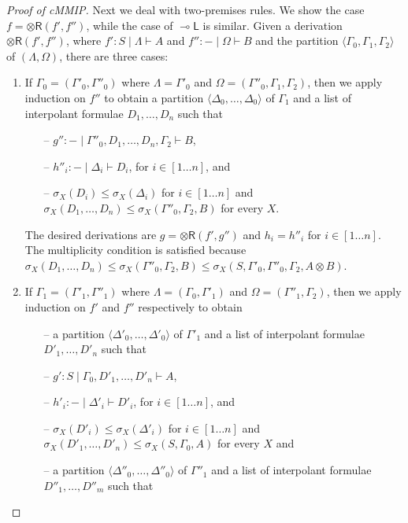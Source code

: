 \documentclass[sn-mathphys-num]{sn-jnl}%
\newcommand{\GG}{\Gamma}
\newcommand{\GD}{\Delta}
\newcommand{\GL}{\Lambda}
\newcommand{\GO}{\Omega}
\newcommand{\vd}{\vdash}
\newcommand{\tr}{\otimes\mathsf{R}}
\newcommand{\ot}{\otimes}
\newcommand{\lolli}{\multimap}
\newcommand{\lleft}{{\lolli}\mathsf{L}}
\newcommand{\gs}[1]{\sigma_{X} (#1)}
\newcommand{\cMMIP}{\textsf{cMMIP}}
\theoremstyle{thmstyleone}%
\theoremstyle{thmstyletwo}%
\theoremstyle{thmstylethree}%
\begin{document}
\begin{proof}[Proof of \cMMIP]
Next we deal with two-premises rules.
We show the case $f = \tr (f' , f'')$, while the case of $\lleft$ is similar.
Given a derivation $\tr (f' , f'')$, where $f' : S \mid \GL \vd A$ and $f'' : {-} \mid \GO \vd B$ and the partition $\langle \GG_0 , \GG_1, \GG_2 \rangle$ of $(\GL, \GO)$, there are three cases:
\begin{enumerate}
  \item If $\GG_0 = (\GG'_0 , \GG''_0)$ where $\GL = \GG'_0$ and $\GO = (\GG''_0 , \GG_1 , \GG_2)$, then we apply induction on $f''$ to obtain a partition $\langle \GD_0, \dots , \GD_0 \rangle$ of $\GG_1$ and a list of interpolant formulae $D_1, \dots , D_n$ such that
  \begin{itemize}
    \item[--] $g'' : {-} \mid \GG''_0 , D_1 , \dots , D_n , \GG_2 \vd B$,
    \item[--] $h''_i : {-} \mid \GD_i \vd D_i$, for $i \in [1 \dots n]$, and 
    \item[--] $\gs{D_i} \leq \gs{\GD_i}$ for $i \in [1 \dots n]$ and $\gs{D_1, \dots , D_n} \leq \gs{ \GG''_0 , \GG_2 , B}$ for every $X$.
  \end{itemize}
  The desired derivations are $g = \tr (f' , g'')$ and $h_i = h''_i$ for $i \in [1 \dots n]$.
  The multiplicity condition is satisfied because $\gs{D_1 , \dots , D_n} \leq \gs{ \GG''_0 , \GG_2 , B} \leq \gs{S, \GG'_0, \GG''_0 , \GG_2 , A \ot B}$.
  \item If $\GG_1 = (\GG'_1 , \GG''_1)$ where $\GL = (\GG_0 , \GG'_1)$ and $\GO = (\GG''_1 , \GG_2)$, then we apply induction on $f'$ and $f''$ respectively to obtain
  \begin{itemize}
    \item[--] a partition $\langle \GD'_0, \dots , \GD'_0 \rangle$ of $\GG'_1$ and a list of interpolant formulae $D'_1, \dots , D'_n$ such that
    \item[--] $g' : S \mid \GG_0 , D'_1 , \dots , D'_n \vd A$,
    \item[--] $h'_i : {-} \mid \GD'_i \vd D'_i$, for $i \in [1 \dots n]$, and 
    \item[--] $\gs{D'_i} \leq \gs{\GD'_i}$ for $i \in [1 \dots n]$ and $\gs{D'_1 , \dots , D'_n} \leq \gs{ S, \GG_0 , A}$ for every $X$ and
  \end{itemize}
  \begin{itemize}
    \item[--] a partition $\langle \GD''_0, \dots , \GD''_0 \rangle$ of $\GG''_1$ and a list of interpolant formulae $D''_1, \dots , D''_m$ such that

\end{itemize}
\end{enumerate}
\end{proof}
\end{document}
